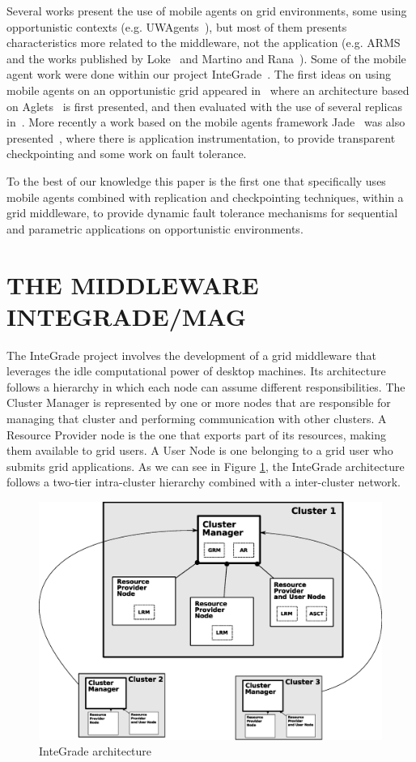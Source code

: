 \documentclass{cpeauth}
\begin{document}
Several works present the use of mobile agents on grid environments, some using
opportunistic contexts (e.g. UWAgents~\cite{fukuda06}), but most of them
presents characteristics more related to the middleware, not the application
(e.g. ARMS~\cite{cao02} and the works published by Loke~\cite{loke03} and
Martino and Rana~\cite{martino04}). Some of the mobile agent work were done
within our project InteGrade~\cite{goldchleger04}. The first ideas on using
mobile agents on an opportunistic grid appeared in~\cite{barbosa04} where an
architecture based on Aglets~\cite{aglets} is first presented, and then
evaluated with the use of several replicas in~\cite{barbosa05}. More recently a
work based on the mobile agents framework Jade~\cite{jade} was also
presented~\cite{lopes05,lopes06_2}, where there is application instrumentation,
to provide transparent checkpointing and some work on fault tolerance.

To the best of our knowledge this paper is the first one that specifically uses
mobile agents combined with replication and checkpointing techniques, within a
grid middleware, to provide dynamic fault tolerance mechanisms for sequential
and parametric applications on opportunistic environments.

\section{THE MIDDLEWARE INTEGRADE/MAG}\label{sec:arch}

The InteGrade project involves the development of a grid middleware that
leverages the idle computational power of desktop machines. 
Its architecture follows a hierarchy in which each node can assume
different responsibilities. The Cluster Manager is represented by one or more
nodes that are responsible for managing that cluster and performing
communication with other clusters. A Resource Provider node is the one that
exports part of its resources, making them available to grid users. A User Node
is one belonging to a grid user who submits grid applications. As we can see in
Figure \ref{fig:integrade}, the InteGrade architecture follows a two-tier
intra-cluster hierarchy combined with a inter-cluster network.

\begin{figure}[th]
\centering \includegraphics[width=.6\columnwidth]{images/integrade2_ieee.eps}
\caption{InteGrade architecture}
\label{fig:integrade}
\end{figure}
\end{document}
